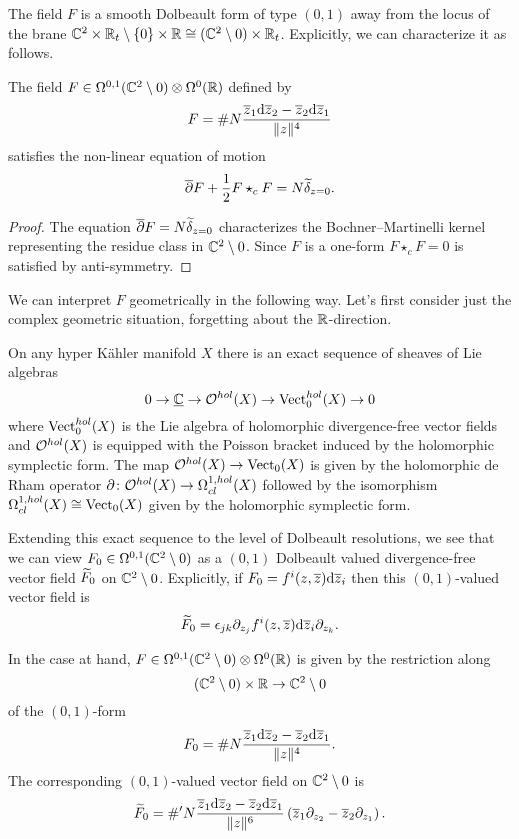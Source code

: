 \documentclass[11pt]{amsart}
\begin{document}
The field $F$ is a smooth Dolbeault form of type $(0,1)$ away from the locus of the brane $\mathbb C^2 \times \mathbb R_t \setminus \{0\} \times \mathbb R \cong (\mathbb C^2 \setminus 0) \times \mathbb R_t$. 
Explicitly, we can characterize it as follows. 

\begin{prop}
The field $F \in \Omega^{0,1} (\mathbb C^2 \setminus 0) \otimes \Omega^{0} (\mathbb R) $ defined by 
\[
F = \# N \frac{\overline{z}_1 {\rm d} \overline{z}_2 - \overline{z}_2 {\rm d} \overline{z}_1}{\|z\|^4} 
\] 
satisfies the non-linear equation of motion 
\[
\overline{\partial} F + \frac12 F \star_c F = N  \widetilde{\delta}_{z=0} .
\]
\end{prop}
\begin{proof}
The equation $\overline{\partial} F = N  \widetilde{\delta}_{z=0}$ characterizes the Bochner--Martinelli kernel representing the residue class in $\mathbb C^2 \setminus 0$. 
Since $F$ is a one-form $F \star_c F = 0$ is satisfied by anti-symmetry. 
\end{proof}

\parsec[]

We can interpret $F$ geometrically in the following way. 
Let's first consider just the complex geometric situation, forgetting about the $\mathbb R$-direction. 
 
On any hyper K\"ahler manifold $X$ there is an exact sequence of sheaves of Lie algebras
\[
0 \to \smash{\underline{\mathbb C}} \to \mathcal O^{hol}(X) \to {\rm Vect}_0^{hol} (X) \to 0
\]
where ${\rm Vect}^{hol}_0(X)$ is the Lie algebra of holomorphic divergence-free vector fields and $\mathcal O^{hol}(X)$ is equipped with the Poisson bracket induced by the holomorphic symplectic form. 
The map $\mathcal O^{hol}(X) \to {\rm Vect}_0(X)$ is given by the holomorphic de Rham operator $\partial \colon \mathcal O^{hol}(X) \to \Omega^{1,hol}_{cl}(X)$ followed by the isomorphism 
$\Omega^{1,hol}_{cl} (X) \cong {\rm Vect}_0(X)$ given by the holomorphic symplectic form. 

Extending this exact sequence to the level of Dolbeault resolutions, we see that we can view $F_0 \in \Omega^{0,1}(\mathbb C^2 \setminus 0)$ as a $(0,1)$ Dolbeault valued divergence-free vector field $\widetilde{F}_0$ on $\mathbb C^2 \setminus 0$. 
Explicitly, if $F_0 = f^i (z,\overline{z}) {\rm d} \overline{z}_i$ then this $(0,1)$-valued vector field is
\[
\widetilde{F}_0 = \epsilon_{jk} \partial_{z_j} f^i (z,\overline{z}) {\rm d} \overline{z}_i \partial_{z_k} .
\]

In the case at hand, $F \in \Omega^{0,1}(\mathbb C^2 \setminus 0) \otimes \Omega^0(\mathbb R)$ is given by the restriction along 
\[
(\mathbb C^2 \setminus 0) \times \mathbb R \to \mathbb C^2 \setminus 0
\]
of the $(0,1)$-form
\[
F_0 = \# N \frac{\overline{z}_1 {\rm d} \overline{z}_2 - \overline{z}_2 {\rm d} \overline{z}_1}{\|z\|^4} .
\] 
The corresponding $(0,1)$-valued vector field on $\mathbb C^2 \setminus 0$ is
\[
\widetilde{F}_0 = \#' N \frac{\overline{z}_1 {\rm d} \overline{z}_2 - \overline{z}_2 {\rm d} \overline{z}_1}{\|z\|^6} \left(\overline{z}_1 \partial_{z_2} - \overline{z}_2 \partial_{z_1}\right) .
\] 
\end{document}
